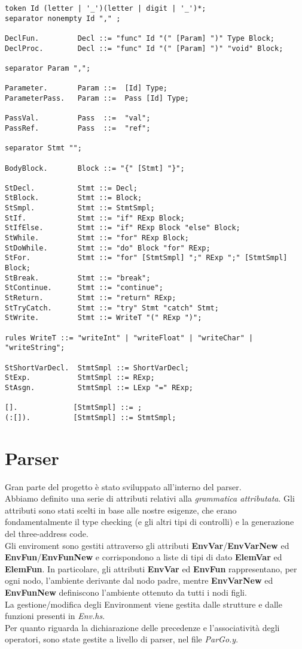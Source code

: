 \documentclass[12pt]{article}
\begin{document}
\begin{verbatim}
token Id (letter | '_')(letter | digit | '_')*;
separator nonempty Id "," ;

DeclFun.         Decl ::= "func" Id "(" [Param] ")" Type Block;
DeclProc.        Decl ::= "func" Id "(" [Param] ")" "void" Block;

separator Param ",";

Parameter.       Param ::=  [Id] Type;
ParameterPass.   Param ::=  Pass [Id] Type;

PassVal.         Pass  ::=  "val";
PassRef.         Pass  ::=  "ref";

separator Stmt "";

BodyBlock.       Block ::= "{" [Stmt] "}";

StDecl.          Stmt ::= Decl;
StBlock.         Stmt ::= Block;
StSmpl.          Stmt ::= StmtSmpl;
StIf.            Stmt ::= "if" RExp Block;
StIfElse.        Stmt ::= "if" RExp Block "else" Block;
StWhile.         Stmt ::= "for" RExp Block;
StDoWhile.       Stmt ::= "do" Block "for" RExp;
StFor.           Stmt ::= "for" [StmtSmpl] ";" RExp ";" [StmtSmpl] Block;
StBreak.         Stmt ::= "break";
StContinue.      Stmt ::= "continue";
StReturn.        Stmt ::= "return" RExp;
StTryCatch.      Stmt ::= "try" Stmt "catch" Stmt;
StWrite.         Stmt ::= WriteT "(" RExp ")";

rules WriteT ::= "writeInt" | "writeFloat" | "writeChar" | "writeString";

StShortVarDecl.  StmtSmpl ::= ShortVarDecl;
StExp.           StmtSmpl ::= RExp;
StAsgn.          StmtSmpl ::= LExp "=" RExp;

[].             [StmtSmpl] ::= ;
(:[]).          [StmtSmpl] ::= StmtSmpl;
\end{verbatim}

\section*{Parser}
Gran parte del progetto è stato sviluppato all'interno del parser.\\
Abbiamo definito una serie di attributi relativi alla \textit{grammatica attributata}. Gli attributi sono stati scelti in base alle nostre esigenze, che erano fondamentalmente il type checking (e gli altri tipi di controlli) e la generazione del three-address code.\\
Gli enviroment sono gestiti attraverso gli attributi \textbf{EnvVar}/\textbf{EnvVarNew} ed \textbf{EnvFun}/\textbf{EnvFunNew} e corrispondono a liste di tipi di dato \textbf{ElemVar} ed \textbf{ElemFun}. In particolare, gli attributi \textbf{EnvVar} ed \textbf{EnvFun} rappresentano, per ogni nodo, l'ambiente  derivante dal nodo padre, mentre \textbf{EnvVarNew} ed \textbf{EnvFunNew} definiscono l'ambiente ottenuto da tutti i nodi figli.\\
La gestione/modifica degli Environment viene gestita dalle strutture e dalle funzioni presenti in \textit{Env.hs}.\\
Per quanto riguarda la dichiarazione delle precedenze e l'associatività degli operatori, sono state gestite a livello di parser, nel file \textit{ParGo.y}.
\end{document}
